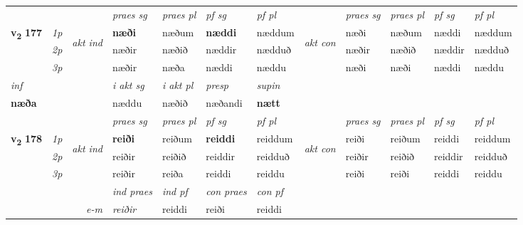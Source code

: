 \begin{longtable}[l]{X>{\footnotesize\itshape}llXXXXlXXXX}
 & &   & \textit{praes sg}  & \textit{praes pl}    & \textit{ pf sg} & \textit{pf pl} & & \textit{praes sg}  & \textit{praes pl}    & \textit{pf sg} & \textit{pf pl }  \\ \cmidrule{4-7} \cmidrule{9-12}
 \multirow{2}{*}{{{\textbf{v{\textsubscript{2}}} \Large{\textbf{177}}}}}  & 1p & \multirow{3}{*}{\begin{turn}{90}\textit{akt ind}\end{turn}} & \textbf{næði} & næðum & \textbf{næddi} & næddum & \multirow{3}{*}{\begin{turn}{90}\textit{akt con}\end{turn}} &næði & næðum & næddi & næddum\\*
 & 2p &  &  næðir  & næðið & næddir & nædduð & & næðir & næðið & næddir & nædduð \\*
 & 3p &  & næðir & næða & næddi & næddu & & næði & næði& næddi & næddu \\*
\cmidrule{4-7} \cmidrule{9-12}

   {\textit{inf}} & &  & \textit{i akt sg} & \textit{i akt pl}   & \textit{presp} & \textit{supin}   \\*
  {\textbf{næða}} & && næddu  & næðið   & næðandi &  \textbf{nætt}   \\*

\midrule

 & &   & \textit{praes sg}  & \textit{praes pl}    & \textit{ pf sg} & \textit{pf pl} & & \textit{praes sg}  & \textit{praes pl}    & \textit{pf sg} & \textit{pf pl }  \\ \cmidrule{4-7} \cmidrule{9-12}
 \multirow{2}{*}{{{\textbf{v{\textsubscript{2}}} \Large{\textbf{178}}}}}  & 1p & \multirow{3}{*}{\begin{turn}{90}\textit{akt ind}\end{turn}} & \textbf{reiði} & reiðum & \textbf{reiddi} & reiddum & \multirow{3}{*}{\begin{turn}{90}\textit{akt con}\end{turn}} &reiði & reiðum & reiddi & reiddum\\*
 & 2p &  &  reiðir  & reiðið & reiddir & reidduð & & reiðir & reiðið & reiddir & reidduð \\*
 & 3p &  & reiðir & reiða & reiddi & reiddu & & reiði & reiði& reiddi & reiddu \\*
\cmidrule{4-7} \cmidrule{9-12}

   && &  \textit{ind praes} & \textit{ind pf} & \textit{con praes} & \textit{con pf} \\*
\multicolumn{3}{r}{\textit{e-m}} & reiðir & reiddi & reiði & reiddi \\*


\end{longtable}
